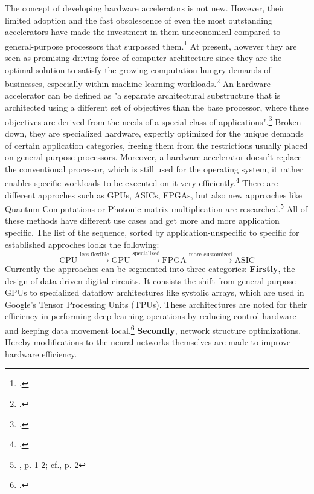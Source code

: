 The concept of developing hardware accelerators is not new.
However, their limited adoption and the fast obsolescence of even the most outstanding accelerators have made the investment in them uneconomical compared to general-purpose processors that surpassed them.\footcite[cf.][2]{peccerilloSurveyHardwareAccelerators2022}
At present, however they are seen as promising driving force of computer architecture since they are the optimal solution to satisfy the growing computation-hungry demands of businesses, especially within machine learning workloads.\footcite[cf.][2-3]{peccerilloSurveyHardwareAccelerators2022}
An hardware accelerator can be defined as "a separate architectural substructure that is architected using a different set of objectives than the base processor, where these objectives are derived from the needs of a special class of applications".\footcite[cf.][2]{peccerilloSurveyHardwareAccelerators2022}
Broken down, they are specialized hardware, expertly optimized for the unique demands of certain application categories, freeing them from the restrictions usually placed on general-purpose processors.
Moreover, a hardware accelerator doesn't replace the conventional processor, which is still used for the operating system, it rather enables specific workloads to be executed on it very efficiently.\footcite[cf.][2-3]{peccerilloSurveyHardwareAccelerators2022}
There are different approches such as \ac{GPU}s, \ac{ASIC}s, \ac{FPGA}s, but also new approaches like Quantum Computations or Photonic matrix multiplication are researched.\footnote{\cite{zhouPhotonicMatrixMultiplication2022}, p. 1-2; cf.\cite{baischerLearningHardwareTutorial2021}, p. 2}
All of these methods have different use cases and get more and more application specific. The list of the sequence, sorted by application-unspecific to specific for established approches looks the following:
\[
\text{CPU} \xrightarrow{\text{less flexible}} \text{GPU} \xrightarrow{\text{specialized}} \text{FPGA} \xrightarrow{\text{more customized}} \text{ASIC}
\]
Currently the approaches can be segmented into three categories:
\textbf{Firstly}, the design of data-driven digital circuits.
It consists the shift from general-purpose GPUs to specialized dataflow architectures like systolic arrays, which are used in Google’s Tensor Processing Units (TPUs).
These architectures are noted for their efficiency in performing deep learning operations by reducing control hardware and keeping data movement local.\footcite[cf.][3883]{lehnertMostResourceEfficient2023}
\textbf{Secondly}, network structure optimizations. 
Hereby modifications to the neural networks themselves are made to improve hardware efficiency.
